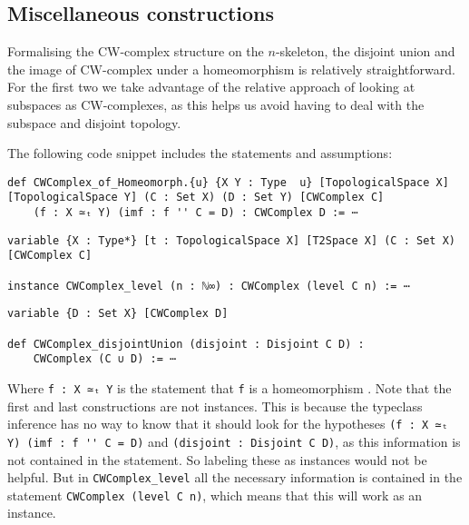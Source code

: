 \subsection{Miscellaneous constructions}

Formalising the CW-complex structure on the $n$-skeleton, the disjoint union and the image of CW-complex under a homeomorphism is relatively straightforward. 
For the first two we take advantage of the relative approach of looking at subspaces as CW-complexes, as this helps us avoid having to deal with the subspace and disjoint topology. 

The following code snippet includes the statements and assumptions:

\begin{lstlisting}
def CWComplex_of_Homeomorph.{u} {X Y : Type  u} [TopologicalSpace X] [TopologicalSpace Y] (C : Set X) (D : Set Y) [CWComplex C] 
    (f : X ≃ₜ Y) (imf : f '' C = D) : CWComplex D := ⋯
\end{lstlisting}
\href{https://github.com/scholzhannah/CWComplexes/blob/7be4872a05b534011cc969eb5b80a4b7f0bf57e2/CWcomplexes/Constructions.lean#L140-L182}{\faExternalLink}

\begin{lstlisting}
variable {X : Type*} [t : TopologicalSpace X] [T2Space X] (C : Set X) [CWComplex C]

instance CWComplex_level (n : ℕ∞) : CWComplex (level C n) := ⋯
\end{lstlisting}
\href{https://github.com/scholzhannah/CWComplexes/blob/7be4872a05b534011cc969eb5b80a4b7f0bf57e2/CWcomplexes/Constructions.lean#L66-L67}{\faExternalLink}

\begin{lstlisting}
variable {D : Set X} [CWComplex D] 

def CWComplex_disjointUnion (disjoint : Disjoint C D) : 
    CWComplex (C ∪ D) := ⋯
\end{lstlisting}
\href{https://github.com/scholzhannah/CWComplexes/blob/7be4872a05b534011cc969eb5b80a4b7f0bf57e2/CWcomplexes/Constructions.lean#L71-L136}{\faExternalLink}

Where \lstinline{f : X ≃ₜ Y} is the statement that \lstinline{f} is a homeomorphism
\href{https://github.com/leanprover-community/mathlib4/blob/ed125a4216d18273cb1b96d4c846d32b85d74faf/Mathlib/Topology/Homeomorph.lean#L37-L43}{\faExternalLink}. 
Note that the first and last constructions are not instances.
This is because the typeclass inference has no way to know that it should look for the hypotheses \lstinline{(f : X ≃ₜ Y) (imf : f '' C = D)} and \lstinline{(disjoint : Disjoint C D)}, as this information is not contained in the statement. 
So labeling these as instances would not be helpful. 
But in \lstinline{CWComplex_level} all the necessary information is contained in the statement \lstinline{CWComplex (level C n)}, which means that this will work as an instance.